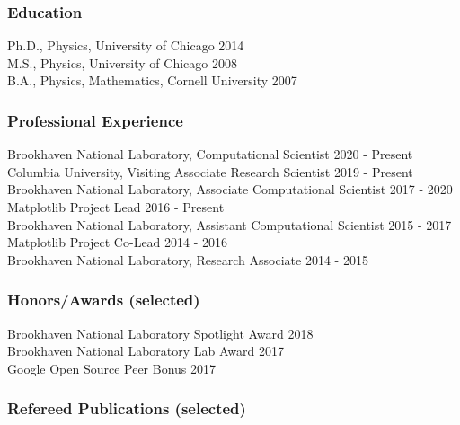\documentclass[12pt]{article}
\numberwithin{page}{section}
\begin{document}
\subsubsection*{Education}
Ph.D., Physics, University of Chicago \hfill 2014\\
M.S., Physics, University of Chicago \hfill 2008\\
B.A., Physics, Mathematics, Cornell University \hfill 2007

\subsubsection*{Professional Experience}
Brookhaven National Laboratory, Computational Scientist \hfill 2020 - Present\\
Columbia University, Visiting Associate Research Scientist \hfill 2019 - Present \\
Brookhaven National Laboratory, Associate Computational Scientist \hfill 2017 - 2020\\
Matplotlib Project Lead \hfill 2016 - Present\\
Brookhaven National Laboratory, Assistant Computational Scientist \hfill 2015 - 2017\\
Matplotlib Project Co-Lead \hfill 2014 - 2016\\
Brookhaven National Laboratory, Research Associate \hfill 2014 - 2015\\

\subsubsection*{Honors/Awards (selected)}
Brookhaven National Laboratory Spotlight  Award \hfill 2018\\
Brookhaven National Laboratory Lab Award \hfill 2017\\
Google Open Source Peer Bonus \hfill 2017

\subsubsection*{Refereed Publications (selected)}
\end{document}
